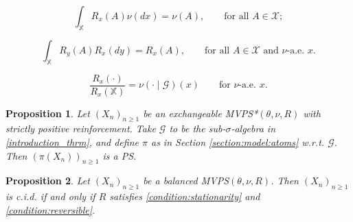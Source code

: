 \documentclass[10pt,a4paper]{amsart}
\newtheorem{proposition}{Proposition}
\begin{document}
\begin{equation}\label{condition:stationarity}\tag{$B$}
\int_\mathbb{X}R_x(A)\nu(dx)=\nu(A),\qquad\mbox{for all }A\in\mathcal{X};
\end{equation}

\begin{equation}\label{condition:reversible}\tag{$C$}
\int_\mathbb{X}R_y(A)R_x(dy)=R_x(A),\qquad\mbox{for all }A\in\mathcal{X}\mbox{ and }\nu\mbox{-a.e. }x.
\end{equation}

\begin{equation}\label{introduction_thrm}
\frac{R_x(\cdot)}{R_x(\mathbb{X})}=\nu(\cdot\mid\mathcal{G})(x)\qquad\mbox{for }\nu\mbox{-a.e. }x.
\end{equation}

\begin{proposition}\label{atoms_general}
Let $(X_n)_{n\geq 1}$ be an exchangeable MVPS*$(\theta,\nu,R)$ with strictly positive reinforcement. Take $\mathcal{G}$ to be the sub-$\sigma$-algebra in \eqref{introduction_thrm}, and define $\pi$ as in Section \ref{section:model:atoms} w.r.t. $\mathcal{G}$. Then $(\pi(X_n))_{n\geq 1}$ is a PS.
\end{proposition}

\begin{proposition}\label{results:other:cid}
Let $(X_n)_{n\geq1}$ be a balanced MVPS$(\theta,\nu,R)$. Then $(X_n)_{n\geq1}$ is c.i.d. if and only if $R$ satisfies \eqref{condition:stationarity} and \eqref{condition:reversible}.
\end{proposition}
\end{document}
